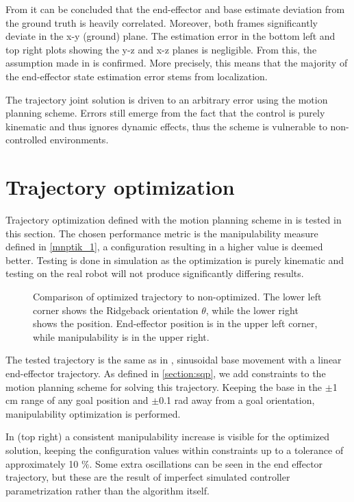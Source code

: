 \documentclass[times, utf8, diplomski, english]{fer}
\begin{document}
From  it can be concluded that the end-effector and base estimate deviation from the ground truth is heavily correlated.
Moreover, both frames significantly deviate in the x-y (ground) plane.
The estimation error in the bottom left and top right plots showing the y-z and x-z planes is negligible.
From this, the assumption made in  is confirmed.
More precisely, this means that the majority of the end-effector state estimation error stems from localization.

The trajectory joint solution is driven to an arbitrary error using the motion planning scheme.
Errors still emerge from the fact that the control is purely kinematic and thus ignores dynamic effects, thus the scheme is vulnerable to non-controlled environments.

\section{Trajectory optimization}
Trajectory optimization defined with the motion planning scheme in  is tested in this section.
The chosen performance metric is the manipulability measure defined in \eqref{mnptik_1}, a configuration resulting in a higher value is deemed better.
Testing is done in simulation as the optimization is purely kinematic and testing on the real robot will not produce significantly differing results.
\begin{figure}[h]
\centering

\caption{Comparison of optimized trajectory to non-optimized.
The lower left corner shows the Ridgeback orientation $\theta$, while the lower right shows the position. End-effector position is in the upper left corner, while manipulability is in the upper right.}
\label{fig:dual_trajectory_opti}
\end{figure}

The tested trajectory is the same as in , sinusoidal base movement with a linear end-effector trajectory.
As defined in \ref{section:sqp}, we add constraints to the motion planning scheme for solving this trajectory.
Keeping the base in the $\pm$1 cm range of any goal position and $\pm$0.1 rad away from a goal orientation, manipulability optimization is performed.

In  (top right) a consistent manipulability increase is visible for the optimized solution, keeping the configuration values within constraints up to a tolerance of approximately 10 $\%$.
Some extra oscillations can be seen in the end effector trajectory, but these are the result of imperfect simulated controller parametrization rather than the algorithm itself.
\end{document}
